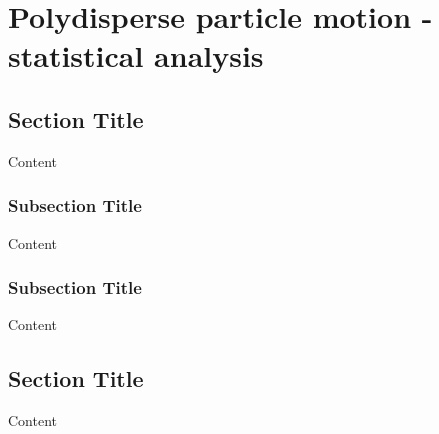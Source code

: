 \documentclass[../main.tex]{subfiles}
\begin{document}
\chapter{Polydisperse particle motion - statistical analysis} %

\label{ch:stat} %


\section{Section Title}

Content


\subsection{Subsection Title}

Content


\subsection{Subsection Title}

Content


\section{Section Title}

Content
\end{document}
